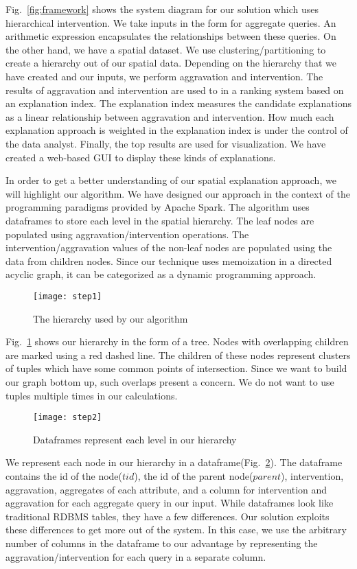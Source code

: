 Fig.~\ref{fig:framework} shows the system diagram for our solution which uses hierarchical intervention. We take inputs in the form for aggregate queries. An arithmetic expression encapsulates the relationships between these queries. On the other hand, we have a spatial dataset. We use clustering/partitioning to create a hierarchy out of our spatial data. Depending on the hierarchy that we have created and our inputs, we perform aggravation and intervention. The results of aggravation and intervention are used to in a ranking system based on an explanation index. The explanation index measures the candidate explanations as a linear relationship between aggravation and intervention. How much each explanation approach is weighted in the explanation index is under the control of the data analyst. Finally, the top results are used for visualization. We have created a web-based GUI to display these kinds of explanations.

In order to get a better understanding of our spatial explanation approach, we will highlight our algorithm. We have designed our approach in the context of the programming paradigms provided by Apache Spark. The algorithm uses dataframes to store each level in the spatial hierarchy. The leaf nodes are populated using aggravation/intervention operations. The intervention/aggravation values of the non-leaf nodes are populated using the data from children nodes. Since our technique uses memoization in a directed acyclic graph, it can be categorized as a dynamic programming approach.

\begin{figure}[h]
\texttt{[image: step1]}
\caption{The hierarchy used by our algorithm}
\label{fig:step1}
\end{figure}

Fig.~\ref{fig:step1} shows our hierarchy in the form of a tree. Nodes with overlapping children are marked using a red dashed line. The children of these nodes represent clusters of tuples which have some common points of intersection. Since we want to build our graph bottom up, such overlaps present a concern. We do not want to use tuples multiple times in our calculations.

\begin{figure}[h]
\texttt{[image: step2]}
\caption{Dataframes represent each level in our hierarchy}
\label{fig:step2}
\end{figure}

We represent each node in our hierarchy in a dataframe(Fig.~\ref{fig:step2}). The dataframe contains the id of the node($tid$), the id of the parent node($parent$), intervention, aggravation, aggregates of each attribute, and a column for intervention and aggravation for each aggregate query in our input. While dataframes look like traditional RDBMS tables, they have a few differences. Our solution exploits these differences to get more out of the system. In this case, we use the arbitrary number of columns in the dataframe to our advantage by representing the aggravation/intervention for each query in a separate column.

